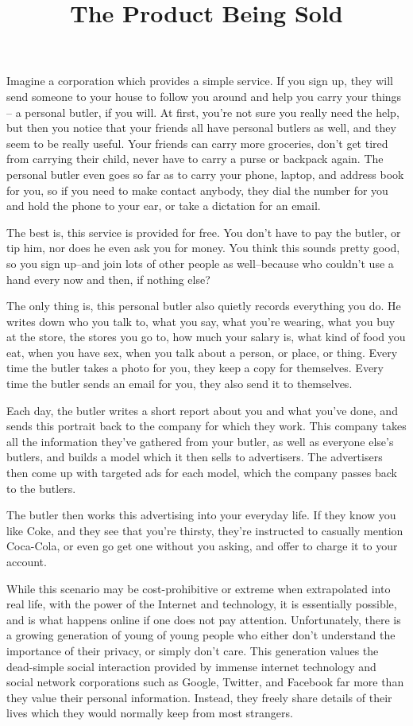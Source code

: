\documentclass[letterpaper]{article}
\title{The Product Being Sold}
\date{}
\begin{document}
    \maketitle
    \thispagestyle{empty}
    \onehalfspacing
    Imagine a corporation which provides a simple service. If you sign up, they will send someone to your house to follow you around and help you carry your things -- a personal butler, if you will. At first, you're not sure you really need the help, but then you notice that your friends all have personal butlers as well, and they seem to be really useful. Your friends can carry more groceries, don't get tired from carrying their child, never have to carry a purse or backpack again. The personal butler even goes so far as to carry your phone, laptop, and address book for you, so if you need to make contact anybody, they dial the number for you and hold the phone to your ear, or take a dictation for an email.

The best is, this service is provided for free. You don't have to pay the butler, or tip him, nor does he even ask you for money. You think this sounds pretty good, so you sign up--and join lots of other people as well--because who couldn't use a hand every now and then, if nothing else?

The only thing is, this personal butler also quietly records everything you do. He writes down who you talk to, what you say, what you're wearing, what you buy at the store, the stores you go to, how much your salary is, what kind of food you eat, when you have sex, when you talk about a person, or place, or thing. Every time the butler takes a photo for you, they keep a copy for themselves. Every time the butler sends an email for you, they also send it to themselves.

Each day, the butler writes a short report about you and what you've done, and sends this portrait back to the company for which they work. This company takes all the information they've gathered from your butler, as well as everyone else's butlers, and builds a model which it then sells to advertisers. The advertisers then come up with targeted ads for each model, which the company passes back to the butlers.

The butler then works this advertising into your everyday life. If they know you like Coke, and they see that you're thirsty, they're instructed to casually mention Coca-Cola, or even go get one without you asking, and offer to charge it to your account. 

While this scenario may be cost-prohibitive or extreme when extrapolated into real life, with the power of the Internet and technology, it is essentially possible, and is what happens online if one does not pay attention. Unfortunately, there is a growing generation of young of young people who either don't understand the importance of their privacy, or simply don't care. This generation values the dead-simple social interaction provided by immense internet technology and social network corporations such as Google, Twitter, and Facebook far more than they value their personal information. Instead, they freely share details of their lives which they would normally keep from most strangers.
\end{document}
